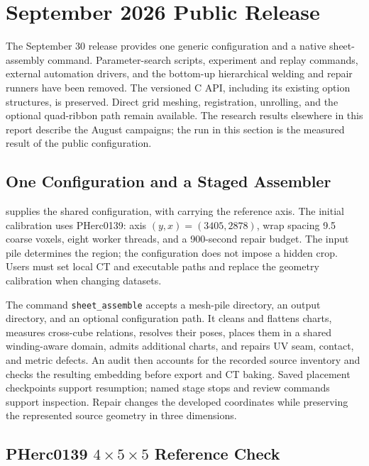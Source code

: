\section{September 2026 Public Release}
\label{sec:public-release}

The September 30 release provides one generic configuration and a native
sheet-assembly command. Parameter-search scripts, experiment and replay
commands, external automation drivers, and the bottom-up hierarchical
welding and repair runners have been removed. The versioned C API,
including its existing option structures, is preserved. Direct grid meshing,
registration, unrolling, and the optional quad-ribbon path remain available.
The research results elsewhere in this report describe the August campaigns;
the run in this section is the measured result of the public configuration.

\subsection{One Configuration and a Staged Assembler}

 supplies the shared configuration, with
 carrying the reference axis. The initial calibration
uses PHerc0139: axis $(y,x)=(3405,2878)$, wrap spacing 9.5 coarse voxels,
eight worker threads, and a 900-second repair budget. The input pile
determines the region; the configuration does not impose a hidden crop.
Users must set local CT and executable paths and replace the geometry
calibration when changing datasets.

The command \texttt{sheet\_assemble} accepts a mesh-pile directory, an output
directory, and an optional configuration path. It cleans and flattens charts,
measures cross-cube relations, resolves their poses, places them in a shared
winding-aware domain, admits additional charts, and repairs UV seam, contact,
and metric defects. An audit then accounts for the recorded source inventory
and checks the resulting embedding before export and CT baking. Saved
placement checkpoints support resumption; named stage stops and review
commands support inspection. Repair changes the developed coordinates while
preserving the represented source geometry in three dimensions.

\subsection{PHerc0139 \texorpdfstring{$4\times5\times5$}{4x5x5} Reference Check}

